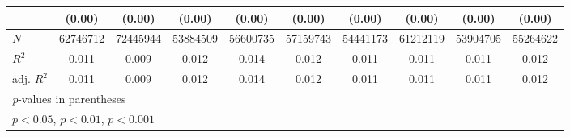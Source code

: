 {\begin{tabular}{l*{9}{c}}
          &   (0.00)         &   (0.00)         &   (0.00)         &   (0.00)         &   (0.00)         &   (0.00)         &   (0.00)         &   (0.00)         &   (0.00)         \\
\hline
\(N\)     & 62746712         & 72445944         & 53884509         & 56600735         & 57159743         & 54441173         & 61212119         & 53904705         & 55264622         \\
\(R^{2}\) &    0.011         &    0.009         &    0.012         &    0.014         &    0.012         &    0.011         &    0.011         &    0.011         &    0.012         \\
adj. \(R^{2}\)&    0.011         &    0.009         &    0.012         &    0.014         &    0.012         &    0.011         &    0.011         &    0.011         &    0.012         \\
\hline\hline
\multicolumn{10}{l}{\footnotesize \textit{p}-values in parentheses}\\
\multicolumn{10}{l}{\footnotesize \sym{*} \(p<0.05\), \sym{**} \(p<0.01\), \sym{***} \(p<0.001\)}\\
\end{tabular}
}
